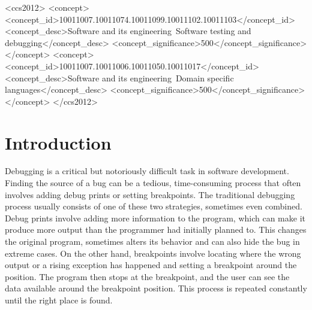 \documentclass[sigconf,review]{acmart}
\begin{document}
    \begin{CCSXML}
        <ccs2012>
        <concept>
        <concept_id>10011007.10011074.10011099.10011102.10011103</concept_id>
        <concept_desc>Software and its engineering~Software testing and debugging</concept_desc>
        <concept_significance>500</concept_significance>
        </concept>
        <concept>
        <concept_id>10011007.10011006.10011050.10011017</concept_id>
        <concept_desc>Software and its engineering~Domain specific languages</concept_desc>
        <concept_significance>500</concept_significance>
        </concept>
        </ccs2012>
    \end{CCSXML}



    \maketitle


    \section{Introduction}
    Debugging is a critical but notoriously difficult task in software development. Finding the source of a bug can be a tedious, time-consuming process that often involves adding debug prints or setting breakpoints. The traditional debugging process usually consists of one of these two strategies, sometimes even combined. Debug prints involve adding more information to the program, which can make it produce more output than the programmer had initially planned to. This changes the original program, sometimes alters its behavior and can also hide the bug in extreme cases. On the other hand, breakpoints involve locating where the wrong output or a rising exception has happened and setting a breakpoint around the position. The program then stops at the breakpoint, and the user can see the data available around the breakpoint position. This process is repeated constantly until the right place is found.
\end{document}
